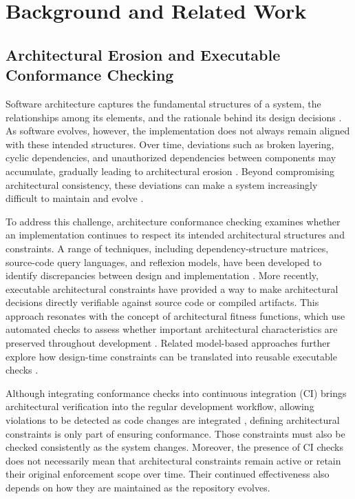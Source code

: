 \section{Background and Related Work}
\label{sec:background-related-work}

\subsection{Architectural Erosion and Executable Conformance Checking}

Software architecture captures the fundamental structures of a system, the relationships among its elements, and the rationale behind its design decisions \cite{bass2012,perry1992}. As software evolves, however, the implementation does not always remain aligned with these intended structures. Over time, deviations such as broken layering, cyclic dependencies, and unauthorized dependencies between components may accumulate, gradually leading to architectural erosion \cite{desilva2012,perry1992,passos2010}. Beyond compromising architectural consistency, these deviations can make a system increasingly difficult to maintain and evolve \cite{bass2012,passos2010}.

To address this challenge, architecture conformance checking examines whether an implementation continues to respect its intended architectural structures and constraints. A range of techniques, including dependency-structure matrices, source-code query languages, and reflexion models, have been developed to identify discrepancies between design and implementation \cite{passos2010}. More recently, executable architectural constraints have provided a way to make architectural decisions directly verifiable against source code or compiled artifacts. This approach resonates with the concept of architectural fitness functions, which use automated checks to assess whether important architectural characteristics are preserved throughout development \cite{ford2017}. Related model-based approaches further explore how design-time constraints can be translated into reusable executable checks \cite{kallel2017generating}.

Although integrating conformance checks into continuous integration (CI) brings architectural verification into the regular development workflow, allowing violations to be detected as code changes are integrated \cite{pinto2017}, defining architectural constraints is only part of ensuring conformance. Those constraints must also be checked consistently as the system changes. Moreover, the presence of CI checks does not necessarily mean that architectural constraints remain active or retain their original enforcement scope over time. Their continued effectiveness also depends on how they are maintained as the repository evolves.

